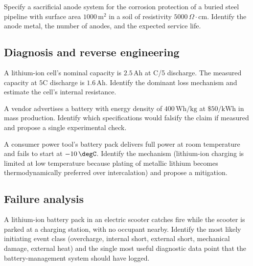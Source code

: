 \begin{exercise}
Specify a sacrificial anode system for the corrosion protection of
a buried steel pipeline with surface area $1000\,\text{m}^2$ in a
soil of resistivity $5000\,\Omega\cdot\text{cm}$. Identify the
anode metal, the number of anodes, and the expected service life.
\end{exercise}

\subsection*{Diagnosis and reverse engineering}

\begin{exercise}
A lithium-ion cell's nominal capacity is $2.5\,\text{Ah}$ at C/5
discharge. The measured capacity at $5\text{C}$ discharge is $1.6\,
\text{Ah}$. Identify the dominant loss mechanism and estimate the
cell's internal resistance.
\end{exercise}

\begin{exercise}
A vendor advertises a battery with energy density of $400\,\text{Wh}/
\text{kg}$ at $\$50/\text{kWh}$ in mass production. Identify which
specifications would falsify the claim if measured and propose a
single experimental check.
\end{exercise}

\begin{exercise}
A consumer power tool's battery pack delivers full power at room
temperature and fails to start at $-10\,\degC$. Identify the
mechanism (lithium-ion charging is limited at low temperature
because plating of metallic lithium becomes thermodynamically
preferred over intercalation) and propose a mitigation.
\end{exercise}

\subsection*{Failure analysis}

\begin{exercise}
A lithium-ion battery pack in an electric scooter catches fire while
the scooter is parked at a charging station, with no occupant nearby.
Identify the most likely initiating event class (overcharge, internal
short, external short, mechanical damage, external heat) and the
single most useful diagnostic data point that the battery-management
system should have logged.
\end{exercise}

